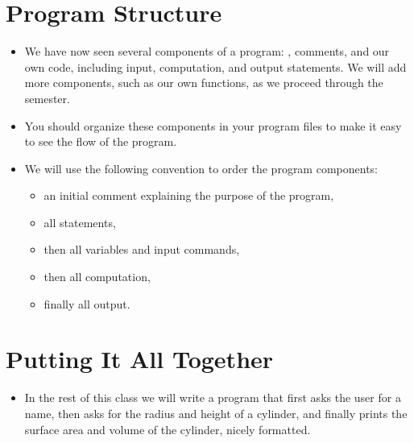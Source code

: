 \documentclass[letterpaper,10pt,english]{sphinxmanual}
\begin{document}
\section{Program Structure}
\label{\detokenize{lecture_notes/lec04_modules_functions1:program-structure}}\begin{itemize}
\item {} 
We have now seen several components of a program:
, comments, and our own code, including input,
computation, and output statements.  We will add more components,
such as our own functions, as we proceed through the semester.

\item {} 
You should organize these components in your program files to make it
easy to see the flow of the program.

\item {} 
We will use the following convention to order the program
components:
\begin{itemize}
\item {} 
an initial comment explaining the purpose of the program,

\item {} 
all  statements,

\item {} 
then all variables and input commands,

\item {} 
then all computation,

\item {} 
finally all output.

\end{itemize}

\end{itemize}


\section{Putting It All Together}
\label{\detokenize{lecture_notes/lec04_modules_functions1:putting-it-all-together}}\begin{itemize}
\item {} 
In the rest of this class we will write a program that first asks
the user for a name, then asks for the radius and height of a
cylinder, and finally prints the surface area and volume of the cylinder,
nicely formatted.

\end{itemize}
\end{document}
